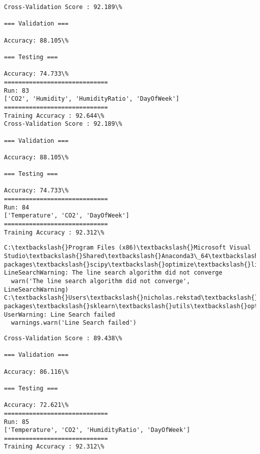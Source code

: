 \documentclass[11pt]{article}
\begin{document}
    \begin{Verbatim}[commandchars=\\\{\}]
Cross-Validation Score : 92.189\%

=== Validation ===

Accuracy: 88.105\%

=== Testing ===

Accuracy: 74.733\%
=============================
Run: 83
['CO2', 'Humidity', 'HumidityRatio', 'DayOfWeek']
=============================
Training Accuracy : 92.644\%
Cross-Validation Score : 92.189\%

=== Validation ===

Accuracy: 88.105\%

=== Testing ===

Accuracy: 74.733\%
=============================
Run: 84
['Temperature', 'CO2', 'DayOfWeek']
=============================
Training Accuracy : 92.312\%

    \end{Verbatim}

    \begin{Verbatim}[commandchars=\\\{\}]
C:\textbackslash{}Program Files (x86)\textbackslash{}Microsoft Visual Studio\textbackslash{}Shared\textbackslash{}Anaconda3\_64\textbackslash{}lib\textbackslash{}site-packages\textbackslash{}scipy\textbackslash{}optimize\textbackslash{}linesearch.py:313: LineSearchWarning: The line search algorithm did not converge
  warn('The line search algorithm did not converge', LineSearchWarning)
C:\textbackslash{}Users\textbackslash{}nicholas.rekstad\textbackslash{}AppData\textbackslash{}Roaming\textbackslash{}Python\textbackslash{}Python36\textbackslash{}site-packages\textbackslash{}sklearn\textbackslash{}utils\textbackslash{}optimize.py:195: UserWarning: Line Search failed
  warnings.warn('Line Search failed')

    \end{Verbatim}

    \begin{Verbatim}[commandchars=\\\{\}]
Cross-Validation Score : 89.438\%

=== Validation ===

Accuracy: 86.116\%

=== Testing ===

Accuracy: 72.621\%
=============================
Run: 85
['Temperature', 'CO2', 'HumidityRatio', 'DayOfWeek']
=============================
Training Accuracy : 92.312\%

    \end{Verbatim}
\end{document}

